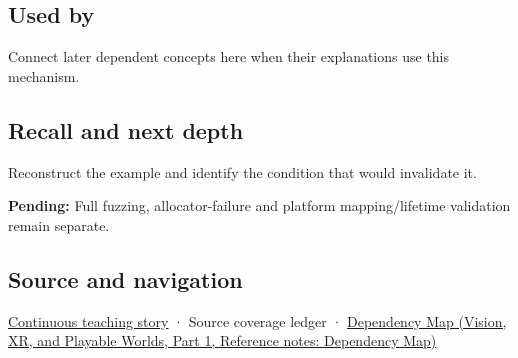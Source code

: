 \subsection{Used by}\label{appendix-652d81568de9-used-by}

\hypertarget{appendix-652d81568de9-used-by}{}

Connect later dependent concepts here when their explanations use this mechanism.

\subsection{Recall and next depth}\label{appendix-652d81568de9-recall-and-next-depth}

\hypertarget{appendix-652d81568de9-recall-and-next-depth}{}

Reconstruct the example and identify the condition that would invalidate it.

\textbf{Pending:} Full fuzzing, allocator-failure and platform mapping/lifetime validation remain separate.

\subsection{Source and navigation}\label{appendix-652d81568de9-source-and-navigation}

\hypertarget{appendix-652d81568de9-source-and-navigation}{}

\hyperref[01-foundations-i-ch002-bytes-become-a-durable-agreement]{Continuous teaching story} · {Source coverage ledger} · \href{../07-Vision-XR-and-Playable-Worlds-P01/main.pdf\#appendix-4ad47bdd269a}{Dependency Map (Vision, XR, and Playable Worlds, Part 1, Reference notes: Dependency Map)}
